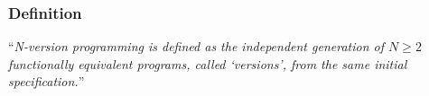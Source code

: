 \begin{frame}
	\frametitle{Definition}
	\enquote{\emph{N-version programming is defined as the independent generation of $ N \geq 2 $ functionally equivalent programs, called \enquote{versions}, from the same initial specification.}} \cite{Chen1978}

\end{frame}